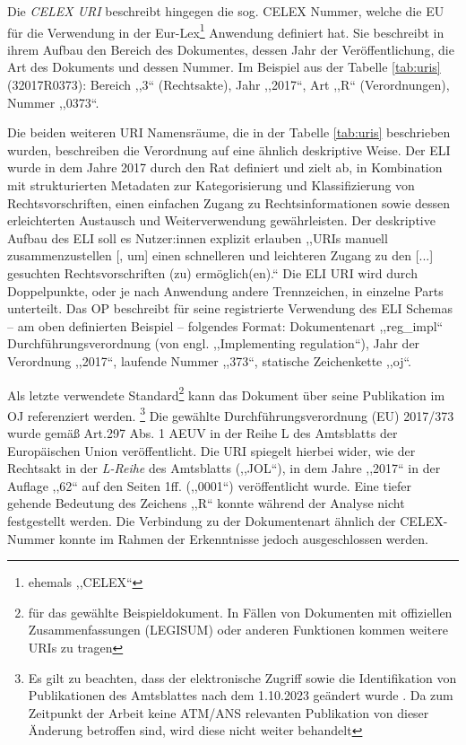     \pagebreak
    \noindent
    Die \textit{CELEX URI} beschreibt hingegen die sog. CELEX Nummer, welche die EU für die Verwendung in der Eur-Lex\footnote{ehemals ,,CELEX``} Anwendung definiert hat.
    Sie beschreibt in ihrem Aufbau den Bereich des Dokumentes, dessen Jahr der Veröffentlichung, die Art des Dokuments und dessen Nummer. \cite[2, 24]{eu_celex}
    Im Beispiel aus der Tabelle \ref{tab:uris} (32017R0373): Bereich ,,3`` (Rechtsakte), Jahr ,,2017``, Art ,,R`` (Verordnungen), Nummer ,,0373``.
    
    \medskip
    Die beiden weiteren URI Namensräume, die in der Tabelle \ref{tab:uris} beschrieben wurden, beschreiben die Verordnung auf eine ähnlich deskriptive Weise.
    Der \acf{ELI} wurde in dem Jahre 2017 durch den Rat definiert und zielt ab, in Kombination mit strukturierten Metadaten zur Kategorisierung und Klassifizierung von Rechtsvorschriften, einen einfachen Zugang zu Rechtsinformationen sowie dessen erleichterten Austausch und Weiterverwendung gewährleisten. \cite[Art. 5]{52017XG1222}
    Der deskriptive Aufbau des \ac{ELI} soll es Nutzer:innen explizit erlauben ,,\acp{URI} manuell zusammenzustellen [, um] einen schnelleren und leichteren Zugang zu den [...] gesuchten Rechtsvorschriften (zu) ermöglich(en).``\cite[Art. 6c]{52017XG1222}
    Die \ac{ELI} \ac{URI} wird durch Doppelpunkte, oder je nach Anwendung andere Trennzeichen, in einzelne Parts unterteilt.
    Das \acf{OP} beschreibt für seine registrierte Verwendung des ELI Schemas -- am oben definierten Beispiel -- folgendes Format: 
    Dokumentenart ,,reg\_impl`` Durchführungsverordnung (von engl. ,,Implementing regulation``), Jahr der Verordnung ,,2017``,  laufende Nummer ,,373``, statische Zeichenkette ,,oj``. \cite[vgl.][]{eu_op_eli_register}
    
    \medskip
    Als letzte verwendete Standard\footnote{für das gewählte Beispieldokument. In Fällen von Dokumenten mit offiziellen Zusammenfassungen (LEGISUM) oder anderen Funktionen kommen weitere \acp{URI} zu tragen} kann das Dokument über seine Publikation im \acf{OJ} referenziert werden. \footnote{Es gilt zu beachten, dass der elektronische Zugriff sowie die Identifikation von Publikationen des Amtsblattes nach dem 1.10.2023 geändert wurde \cite[siehe][]{eu_oj_actbyact}. Da zum Zeitpunkt der Arbeit keine ATM/ANS relevanten Publikation von dieser Änderung betroffen sind, wird diese nicht weiter behandelt}
    Die gewählte Durchführungsverordnung (EU) 2017/373 wurde gemäß Art.297 Abs. 1 \ac{AEUV} in der Reihe L des Amtsblatts der Europäischen Union veröffentlicht. 
    Die \ac{URI} spiegelt hierbei wider, wie der Rechtsakt in der \textit{L-Reihe} des Amtsblatts (,,JOL``), in dem Jahre ,,2017`` in der Auflage ,,62`` auf den Seiten 1ff. (,,0001``) veröffentlicht wurde.
    Eine tiefer gehende Bedeutung des Zeichens ,,R`` konnte während der Analyse nicht festgestellt werden.
    Die Verbindung zu der Dokumentenart ähnlich der CELEX-Nummer konnte im Rahmen der Erkenntnisse jedoch ausgeschlossen werden. 
    
